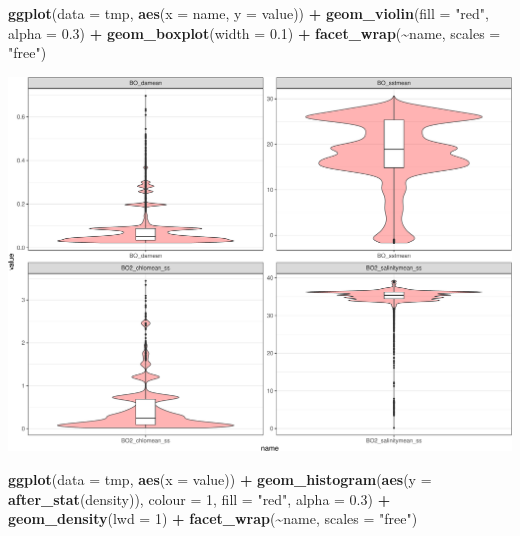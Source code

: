 \documentclass[
]{book}
\newenvironment{Shaded}{\begin{snugshade}}{\end{snugshade}}
\newcommand{\AttributeTok}[1]{\textcolor[rgb]{0.13,0.29,0.53}{#1}}
\newcommand{\DecValTok}[1]{\textcolor[rgb]{0.00,0.00,0.81}{#1}}
\newcommand{\FloatTok}[1]{\textcolor[rgb]{0.00,0.00,0.81}{#1}}
\newcommand{\FunctionTok}[1]{\textcolor[rgb]{0.13,0.29,0.53}{\textbf{#1}}}
\newcommand{\NormalTok}[1]{#1}
\newcommand{\SpecialCharTok}[1]{\textcolor[rgb]{0.81,0.36,0.00}{\textbf{#1}}}
\newcommand{\StringTok}[1]{\textcolor[rgb]{0.31,0.60,0.02}{#1}}
\begin{document}
\begin{Shaded}
\begin{Highlighting}[]
\FunctionTok{ggplot}\NormalTok{(}\AttributeTok{data =}\NormalTok{ tmp, }\FunctionTok{aes}\NormalTok{(}\AttributeTok{x =}\NormalTok{ name, }\AttributeTok{y =}\NormalTok{ value)) }\SpecialCharTok{+}
    \FunctionTok{geom\_violin}\NormalTok{(}\AttributeTok{fill =} \StringTok{"red"}\NormalTok{, }\AttributeTok{alpha =} \FloatTok{0.3}\NormalTok{) }\SpecialCharTok{+}
    \FunctionTok{geom\_boxplot}\NormalTok{(}\AttributeTok{width =} \FloatTok{0.1}\NormalTok{) }\SpecialCharTok{+} \FunctionTok{facet\_wrap}\NormalTok{(}\SpecialCharTok{\textasciitilde{}}\NormalTok{name,}
    \AttributeTok{scales =} \StringTok{"free"}\NormalTok{)}
\end{Highlighting}
\end{Shaded}

\includegraphics{_main_files/figure-latex/unnamed-chunk-49-2.pdf}

\begin{Shaded}
\begin{Highlighting}[]
\FunctionTok{ggplot}\NormalTok{(}\AttributeTok{data =}\NormalTok{ tmp, }\FunctionTok{aes}\NormalTok{(}\AttributeTok{x =}\NormalTok{ value)) }\SpecialCharTok{+} \FunctionTok{geom\_histogram}\NormalTok{(}\FunctionTok{aes}\NormalTok{(}\AttributeTok{y =} \FunctionTok{after\_stat}\NormalTok{(density)),}
    \AttributeTok{colour =} \DecValTok{1}\NormalTok{, }\AttributeTok{fill =} \StringTok{"red"}\NormalTok{, }\AttributeTok{alpha =} \FloatTok{0.3}\NormalTok{) }\SpecialCharTok{+}
    \FunctionTok{geom\_density}\NormalTok{(}\AttributeTok{lwd =} \DecValTok{1}\NormalTok{) }\SpecialCharTok{+} \FunctionTok{facet\_wrap}\NormalTok{(}\SpecialCharTok{\textasciitilde{}}\NormalTok{name,}
    \AttributeTok{scales =} \StringTok{"free"}\NormalTok{)}
\end{Highlighting}
\end{Shaded}
\end{document}
